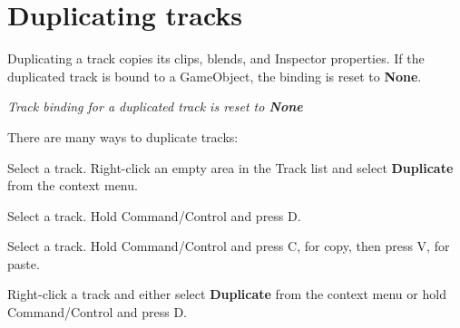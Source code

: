 \chapter{Duplicating tracks}
\hypertarget{md__library_2_package_cache_2com_8unity_8timeline_0d1_87_86_2_documentation_0i_2trk__dup}{}\label{md__library_2_package_cache_2com_8unity_8timeline_0d1_87_86_2_documentation_0i_2trk__dup}
\label{md__library_2_package_cache_2com_8unity_8timeline_0d1_87_86_2_documentation_0i_2trk__dup_autotoc_md1258}%
%
 Duplicating a track copies its clips, blends, and Inspector properties. If the duplicated track is bound to a Game\+Object, the binding is reset to {\bfseries{None}}.



{\itshape Track binding for a duplicated track is reset to {\bfseries{None}}}

There are many ways to duplicate tracks\+:


\begin{DoxyItemize}
\item Select a track. Right-\/click an empty area in the Track list and select {\bfseries{Duplicate}} from the context menu.
\item Select a track. Hold Command/\+Control and press D.
\item Select a track. Hold Command/\+Control and press C, for copy, then press V, for paste.
\item Right-\/click a track and either select {\bfseries{Duplicate}} from the context menu or hold Command/\+Control and press D. 
\end{DoxyItemize}